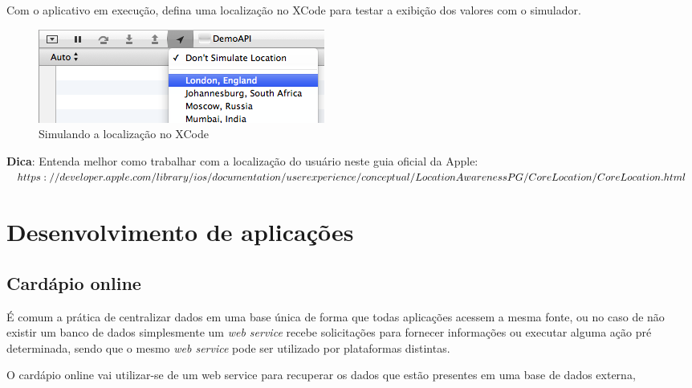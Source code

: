 \documentclass[a4paper,12pt,brazil,oneside]{book}
\begin{document}
Com o aplicativo em execução, defina uma localização no XCode para testar a exibição dos valores com o simulador.

\begin{figure}[H]
  \centering
  \includegraphics[width=.75\textwidth]{figuras/location.png}
  \caption{Simulando a localização no XCode}
  \label{fig:a}
\end{figure}

\begin{framed}

\textbf{Dica}: Entenda melhor como trabalhar com a localização do usuário neste guia oficial da Apple:\\
\(https://developer.apple.com/library/ios/documentation/userexperience/conceptual/\\LocationAwarenessPG/CoreLocation/CoreLocation.html\)
\end{framed}

\chapter{Desenvolvimento de aplicações}

\section{Cardápio online}
É comum a prática de centralizar dados em uma base única de forma que todas aplicações acessem a mesma fonte, ou no caso de não existir um banco de dados simplesmente um \emph{web service} recebe solicitações para fornecer informações ou executar alguma ação pré determinada, sendo que o mesmo \emph{web service} pode ser utilizado por plataformas distintas.

O cardápio online vai utilizar-se de um web service para recuperar os dados que estão presentes em uma base de dados externa,
\end{document}
